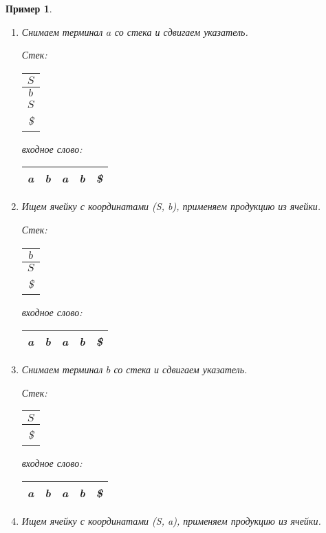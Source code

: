 \documentclass[10pt]{article}         %
\newtheorem{example}{Пример}
\begin{document}
\begin{example}
\begin{enumerate}
			\item Снимаем терминал $a$ со стека и сдвигаем указатель.
			
			Стек: \,
			\begin{tabular}[c]{ |c| } 
				\\ \hline
				$S$ \\ \hline
				$b$ \\ \hline
				$S$ \\ \hline
				\$ \\ \hline
			\end{tabular}  
			\qquad  \qquad \qquad  \qquad входное слово: \,
			\begin{tabular}[c]{ |c|c|c|c|c| } 
				\hline
				a & \textbf{b} & a & b & \$ \\ \hline
			\end{tabular}
			
			\item Ищем ячейку с координатами (S, b), применяем продукцию из ячейки.
			
			Стек: \,
			\begin{tabular}[c]{ |c| } 
				\\ \hline
				$b$ \\ \hline
				$S$ \\ \hline
				\$ \\ \hline
			\end{tabular}  
			\qquad  \qquad \qquad  \qquad входное слово: \,
			\begin{tabular}[c]{ |c|c|c|c|c| } 
				\hline
				a & \textbf{b} & a & b & \$ \\ \hline
			\end{tabular}
			
			\item Снимаем терминал $b$ со стека и сдвигаем указатель.
			
			Стек: \,
			\begin{tabular}[c]{ |c| } 
				\\ \hline
				$S$ \\ \hline
				\$ \\ \hline
			\end{tabular}  
			\qquad  \qquad \qquad  \qquad входное слово: \,
			\begin{tabular}[c]{ |c|c|c|c|c| } 
				\hline
				a & b & \textbf{a} & b & \$ \\ \hline
			\end{tabular}
			
			\item Ищем ячейку с координатами (S, a), применяем продукцию из ячейки.
			

\end{enumerate}
\end{example}
\end{document}
